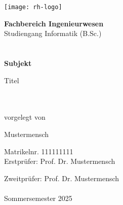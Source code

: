 \begin{titlepage}
 
    \texttt{[image: rh-logo]}\\[1.95cm]
    
    \vspace{2cm}
    \begin{minipage}{\textwidth}
    \hspace{3cm}\begin{minipage}{\dimexpr\textwidth-3cm\relax}
    {\Large\textbf{Fachbereich Ingenieurwesen}}\\
    
    {\Large Studiengang Informatik (B.Sc.)}\\
    \\
    \\
    
    
    {\Large\textbf{Subjekt}}
    
    \parbox{\textwidth}{\Large\raggedright Titel}\\
    \\
    
    {\normalsize\fontsize{11pt}{16.5pt}\selectfont vorgelegt von}
    
    {\Large Mustermensch}
    
    {\normalsize\fontsize{11pt}{16.5pt}\selectfont Matrikelnr. 111111111}\\


    {\normalsize\fontsize{11pt}{16.5pt}\selectfont Erstprüfer: Prof. Dr. Mustermensch}

    {\normalsize\fontsize{11pt}{16.5pt}\selectfont Zweitprüfer: Prof. Dr. Mustermensch}\\
    \\
    
    {\normalsize Sommersemester 2025}
    \end{minipage}
    \end{minipage}
    
    \vfill
    
\end{titlepage}
